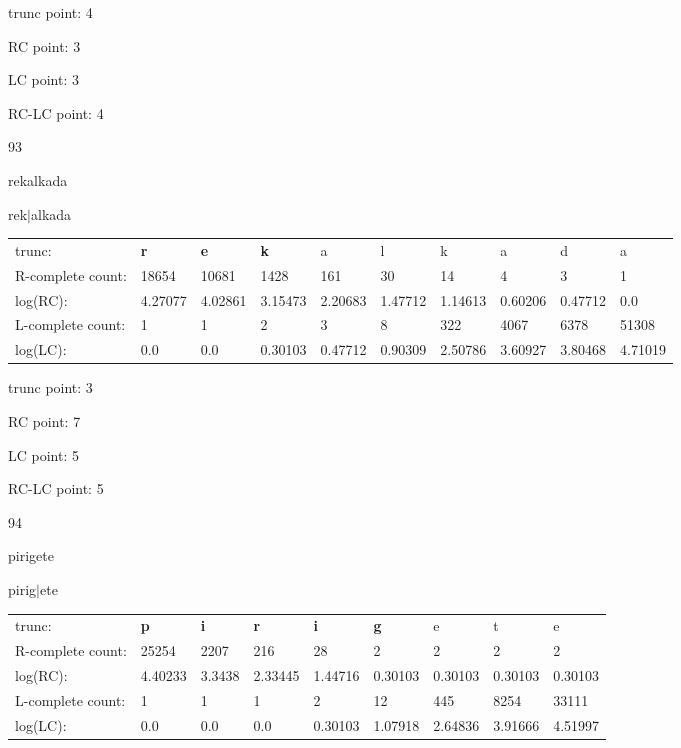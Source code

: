 \documentclass{article}
\begin{document}
trunc point: 4

RC point: 3

LC point: 3

RC-LC point: 4

\vspace{3em}



93

rekalkada

rek$|$alkada

\vspace{1em}

\begin{tabular}{l|lllllllll}

trunc: & {\color{red}\bf r} & {\color{red}\bf e} & {\color{red}\bf k} & a & l & k & a & d & a \\ 
R-complete count: & 18654 & 10681 & 1428 & 161 & 30 & 14 & 4 & 3 & 1 \\ 
log(RC): & 4.27077 & 4.02861 & 3.15473 & 2.20683 & 1.47712 & 1.14613 & 0.60206 & 0.47712 & 0.0 \\ 
L-complete count: & 1 & 1 & 2 & 3 & 8 & 322 & 4067 & 6378 & 51308 \\ 
log(LC): & 0.0 & 0.0 & 0.30103 & 0.47712 & 0.90309 & 2.50786 & 3.60927 & 3.80468 & 4.71019 \\ 
\end{tabular}

trunc point: 3

RC point: 7

LC point: 5

RC-LC point: 5

\vspace{3em}



94

pirigete

pirig$|$ete

\vspace{1em}

\begin{tabular}{l|llllllll}

trunc: & {\color{red}\bf p} & {\color{red}\bf i} & {\color{red}\bf r} & {\color{red}\bf i} & {\color{red}\bf g} & e & t & e \\ 
R-complete count: & 25254 & 2207 & 216 & 28 & 2 & 2 & 2 & 2 \\ 
log(RC): & 4.40233 & 3.3438 & 2.33445 & 1.44716 & 0.30103 & 0.30103 & 0.30103 & 0.30103 \\ 
L-complete count: & 1 & 1 & 1 & 2 & 12 & 445 & 8254 & 33111 \\ 
log(LC): & 0.0 & 0.0 & 0.0 & 0.30103 & 1.07918 & 2.64836 & 3.91666 & 4.51997 \\ 
\end{tabular}
\end{document}
